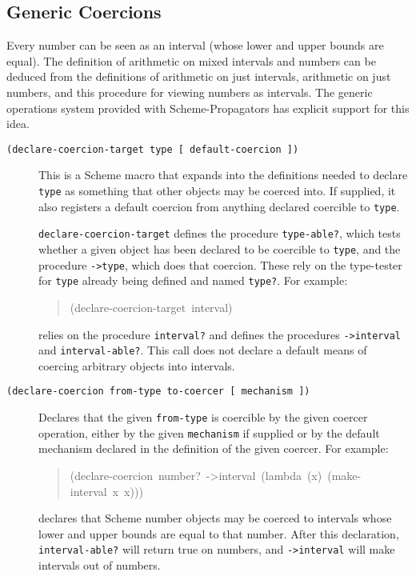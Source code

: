 \documentclass[12pt,letterpaper,english]{article}
\begin{document}

\hypertarget{generic-coercions}{}
\subsection{Generic Coercions}
\label{generic-coercions}

Every number can be seen as an interval (whose lower and upper bounds
are equal).  The definition of arithmetic on mixed intervals and
numbers can be deduced from the definitions of arithmetic on just
intervals, arithmetic on just numbers, and this procedure for viewing
numbers as intervals.  The generic operations system provided with
Scheme-Propagators has explicit support for this idea.
\begin{description}
\item[{\texttt{(declare-coercion-target type {[} default-coercion {]})}}] \leavevmode 
This is a Scheme macro that expands into the definitions needed to
declare \texttt{type} as something that other objects may be coerced
into.  If supplied, it also registers a default coercion from
anything declared coercible to \texttt{type}.

\texttt{declare-coercion-target} defines the procedure \texttt{type-able?},
which tests whether a given object has been declared to be coercible
to \texttt{type}, and the procedure \texttt{->type}, which does that coercion.
These rely on the type-tester for \texttt{type} already being defined and
named \texttt{type?}.  For example:
\begin{quote}{\ttfamily \raggedright \noindent
(declare-coercion-target~interval)
}\end{quote}
relies on the procedure \texttt{interval?} and defines the procedures
\texttt{->interval} and \texttt{interval-able?}.  This call does not declare a
default means of coercing arbitrary objects into intervals.

\item[{\texttt{(declare-coercion from-type to-coercer {[} mechanism {]})}}] \leavevmode 
Declares that the given \texttt{from-type} is coercible by the given
coercer operation, either by the given \texttt{mechanism} if supplied or
by the default mechanism declared in the definition of the given
coercer.  For example:
\begin{quote}{\ttfamily \raggedright \noindent
(declare-coercion~number?~->interval~(lambda~(x)~(make-interval~x~x)))
}\end{quote}
declares that Scheme number objects may be coerced to intervals
whose lower and upper bounds are equal to that number.  After this
declaration, \texttt{interval-able?} will return true on numbers, and
\texttt{->interval} will make intervals out of numbers.


\end{description}
\end{document}
